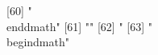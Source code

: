  [60] "\\end{dmath}"                                                                                                                                                                                                                                                                                                                                                                                                                                                                                                                                                                                                                                 
 [61] ""                                                                                                                                                                                                                                                                                                                                                                                                                                                                                                                                                                                                                                             
 [62] "%
 [63] "\\begin{dmath}"                                                                                                                                                                                                                                                                                                                                                                                                                                                                                                                                                                                                                               
